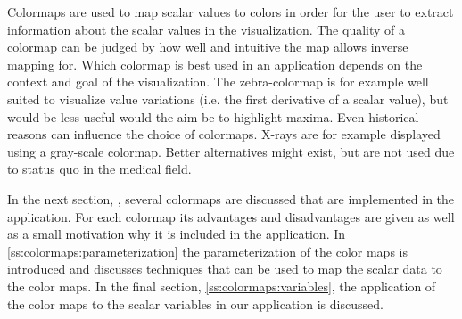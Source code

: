 

Colormaps are used to map scalar values to colors in order for the user to extract information about the scalar values in the visualization. The quality of a colormap can be judged by how well and intuitive the map allows inverse mapping for. Which colormap is best used in an application depends on the context and goal of the visualization. The zebra-colormap is for example well suited to visualize value variations (i.e. the first derivative of a scalar value), but would be less useful would the aim be to highlight maxima. Even historical reasons can influence the choice of colormaps. X-rays are for example displayed using a gray-scale colormap. Better alternatives might exist, but are not used due to status quo in the medical field.















In the next section, , several colormaps are discussed that are implemented in the application. For each colormap its advantages and disadvantages are given as well as a small motivation why it is included in the application. In \cref{ss:colormaps:parameterization} the parameterization of the color maps is introduced and  discusses techniques that can be used to map the scalar data to the color maps. In the final section, \cref{ss:colormaps:variables}, the application of the color maps to the scalar variables in our application is discussed. 





	

